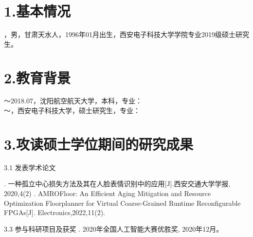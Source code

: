 \begin{resume}
\section*{1.\hspace{0.75em}基本情况}
，男，甘肃天水人，1996年01月出生，西安电子科技大学学院专业2019级硕士研究生。

\section*{2.\hspace{0.75em}教育背景}
\begin{resumelist*}
～2018.07，沈阳航空航天大学，本科，专业： \\
～\phantom{2005.07}，西安电子科技大学，硕士研究生，专业：


\end{resumelist*}
\section*{3.\hspace{0.75em}攻读硕士学位期间的研究成果}
\begin{resumelist}{\hspace{-0.25em}3.1\hspace{0.5em} 发表学术论文}
	
\resumelistitem {}. 一种孤立中心损失方法及其在人脸表情识别中的应用[J].西安交通大学学报, 2020,4(2)
\resumelistitem {}. AMROFloor: An Efficient Aging Mitigation and Resource Optimization Floorplanner for Virtual Coarse-Grained Runtime Reconfigurable FPGAs[J]. Electronics,2022,11(2).
\end{resumelist}


\begin{resumelist}{\hspace{-0.25em}3.3\hspace{0.5em} 参与科研项目及获奖}
\resumelistitem {}. 2020年全国人工智能大赛优胜奖, 2020年12月。
\end{resumelist}
\end{resume}
